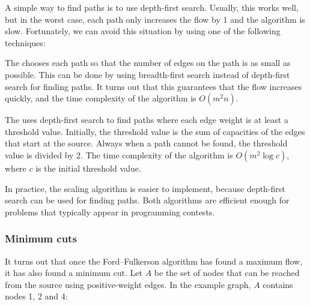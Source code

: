 A simple way to find paths is to use depth-first search.
Usually, this works well, but in the worst case,
each path only increases the flow by 1
and the algorithm is slow.
Fortunately, we can avoid this situation
by using one of the following techniques:


The  \cite{edm72}
chooses each path so that the number of edges
on the path is as small as possible.
This can be done by using breadth-first search
instead of depth-first search for finding paths.
It turns out that this guarantees that
the flow increases quickly, and the time complexity
of the algorithm is $O(m^2 n)$.


The  \cite{ahu91} uses depth-first
search to find paths where each edge weight is
at least a threshold value.
Initially, the threshold value is
the sum of capacities of the edges that
start at the source.
Always when a path cannot be found,
the threshold value is divided by 2.
The time complexity of the algorithm is $O(m^2 \log c)$,
where $c$ is the initial threshold value.

In practice, the scaling algorithm is easier to implement,
because depth-first search can be used for finding paths.
Both algorithms are efficient enough for problems
that typically appear in programming contests.

\subsubsection{Minimum cuts}


It turns out that once the Ford–Fulkerson algorithm
has found a maximum flow,
it has also found a minimum cut.
Let $A$ be the set of nodes
that can be reached from the source
using positive-weight edges.
In the example graph, $A$ contains nodes 1, 2 and 4:


